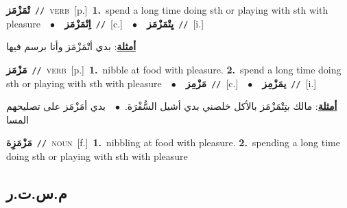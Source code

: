 \documentclass[10pt,a4paper,twoside]{article} %
\begin{document}
\begin{multicols}{2}
{\setlength\topsep{0pt}\textbf{\foreignlanguage{arabic}{تْمَزْمَز}}\ {\color{gray}\texttt{//}\color{black}}\ \textsc{verb}\ [p.]\ \textbf{1.}~spend a long time doing sth or playing with sth with pleasure\ \ $\bullet$\ \ \setlength\topsep{0pt}\textbf{\foreignlanguage{arabic}{اِتْمَزْمَز}}\ {\color{gray}\texttt{//}\color{black}}\ [c.]\ \ $\bullet$\ \ \setlength\topsep{0pt}\textbf{\foreignlanguage{arabic}{يِتْمَزْمَز}}\ {\color{gray}\texttt{//}\color{black}}\ [i.]\  \begin{flushright}\color{gray}\foreignlanguage{arabic}{\textbf{\underline{\foreignlanguage{arabic}{أمثلة}}}: بدي أتْمَزْمَز وأنا برسم فيها}\end{flushright}\color{black}} \vspace{2mm}

{\setlength\topsep{0pt}\textbf{\foreignlanguage{arabic}{مَزْمَز}}\ {\color{gray}\texttt{//}\color{black}}\ \textsc{verb}\ [p.]\ \textbf{1.}~nibble at food with pleasure.  \textbf{2.}~spend a long time doing sth or playing with sth with pleasure\ \ $\bullet$\ \ \setlength\topsep{0pt}\textbf{\foreignlanguage{arabic}{مَزْمِز}}\ {\color{gray}\texttt{//}\color{black}}\ [c.]\ \ $\bullet$\ \ \setlength\topsep{0pt}\textbf{\foreignlanguage{arabic}{يمَزْمِز}}\ {\color{gray}\texttt{//}\color{black}}\ [i.]\  \begin{flushright}\color{gray}\foreignlanguage{arabic}{\textbf{\underline{\foreignlanguage{arabic}{أمثلة}}}: مالك بتِتْمَزْمَز بالأكل خلصني بدي أشيل السُّفْرَة.\ $\bullet$\ \  بدي أمَزْمَز على تصليحهم المسا}\end{flushright}\color{black}} \vspace{2mm}

{\setlength\topsep{0pt}\textbf{\foreignlanguage{arabic}{مَزْمَزِة}}\ {\color{gray}\texttt{//}\color{black}}\ \textsc{noun}\ [f.]\ \textbf{1.}~nibbling at food with pleasure.  \textbf{2.}~spending a long time doing sth or playing with sth with pleasure\ } \vspace{2mm}

\vspace{-3mm}
\subsection*{\color{blue}\foreignlanguage{arabic}{م.س.ت.ر}\color{blue}{ (ntws)}} 


\end{multicols}
\end{document}
